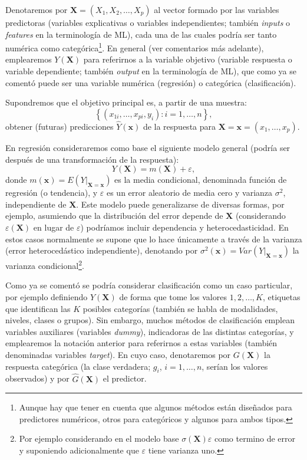 \documentclass[
  spanish,
]{book}
\theoremstyle{break}
\theoremstyle{definition}
\theoremstyle{definition}
\theoremstyle{definition}
\theoremstyle{remark}
\begin{document}
Denotaremos por \(\mathbf{X}=(X_1, X_2, \ldots, X_p)\) al vector formado por las variables predictoras
(variables explicativas o variables independientes; también \emph{inputs} o \emph{features} en la terminología de ML), cada una de las cuales podría ser tanto numérica como categórica\footnote{Aunque hay que tener en cuenta que algunos métodos están diseñados para predictores numéricos, otros para categóricos y algunos para ambos tipos.}.
En general (ver comentarios más adelante), emplearemos \(Y\left(\mathbf{X} \right)\) para referirnos a la variable objetivo (variable respuesta o variable dependiente; también \emph{output} en la terminología de ML), que como ya se comentó puede ser una variable numérica (regresión) o categórica (clasificación).

Supondremos que el objetivo principal es, a partir de una muestra:
\[\left\{ \left( x_{1i}, \ldots, x_{pi}, y_{i} \right)  : i = 1, \ldots, n \right\},\]
obtener (futuras) predicciones \(\hat Y\left(\mathbf{x} \right)\) de la respuesta para \(\mathbf{X}=\mathbf{x}=\left(x_{1}, \ldots, x_{p}\right)\).

En regresión consideraremos como base el siguiente modelo general (podría ser después de una transformación de la respuesta):
\begin{equation} 
  Y(\mathbf{X})=m(\mathbf{X})+\varepsilon,
  \label{eq:modelogeneral}
\end{equation}
donde \(m(\mathbf{x}) = E\left( \left. Y\right\vert_{\mathbf{X}=\mathbf{x}} \right)\) es la media condicional, denominada función de regresión (o tendencia), y \(\varepsilon\) es un error aleatorio de media cero y varianza \(\sigma^2\), independiente de \(\mathbf{X}\).
Este modelo puede generalizarse de diversas formas, por ejemplo, asumiendo que la distribución del error depende de \(\mathbf{X}\) (considerando \(\varepsilon(\mathbf{X})\) en lugar de \(\varepsilon\)) podríamos incluir dependencia y heterocedasticidad.
En estos casos normalmente se supone que lo hace únicamente a través de la varianza (error heterocedástico independiente), denotando por \(\sigma^2(\mathbf{x}) = Var\left( \left. Y\right\vert_{\mathbf{X}=\mathbf{x}} \right)\) la varianza condicional\footnote{Por ejemplo considerando en el modelo base \(\sigma(\mathbf{X})\varepsilon\) como termino de error y suponiendo adicionalmente que \(\varepsilon\) tiene varianza uno.}.

Como ya se comentó se podría considerar clasificación como un caso particular, por ejemplo definiendo \(Y\left(\mathbf{X} \right)\) de forma que tome los valores \(1, 2, \ldots, K\), etiquetas que identifican las \(K\) posibles categorías (también se habla de modalidades, niveles, clases o grupos).
Sin embargo, muchos métodos de clasificación emplean variables auxiliares (variables \emph{dummy}), indicadoras de las distintas categorías, y emplearemos la notación anterior para referirnos a estas variables (también denominadas variables \emph{target}). En cuyo caso, denotaremos por \(G \left(\mathbf{X} \right)\) la respuesta categórica (la clase verdadera; \(g_i\), \(i =1, \ldots, n\), serían los valores observados) y por \(\hat G \left(\mathbf{X} \right)\) el predictor.
\end{document}
